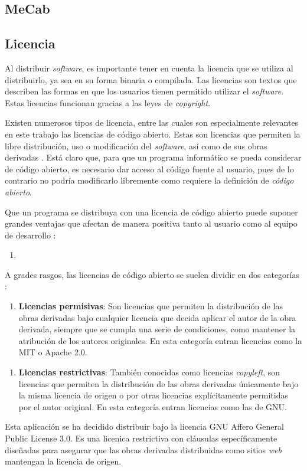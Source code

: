 \subsection{MeCab}

\subsection{Licencia}

Al distribuir \textit{software}, es importante tener en cuenta la licencia que se utiliza al distribuirlo, ya sea en su forma binaria o compilada. Las licencias son textos que describen las formas en que los usuarios tienen permitido utilizar el \textit{software}. Estas licencias funcionan gracias a las leyes de \textit{copyright}.

Existen numerosos tipos de licencia, entre las cuales son especialmente relevantes en este trabajo las licencias de código abierto. Estas son licencias que permiten la libre distribución, uso o modificación del \textit{software}, así como de sus obras derivadas \citationNeeded. Está claro que, para que un programa informático se pueda considerar de código abierto, es necesario dar acceso al código fuente al usuario, pues de lo contrario no podría modificarlo libremente como requiere la definición de \textit{código abierto}.

Que un programa se distribuya con una licencia de código abierto puede suponer grandes ventajas que afectan de manera positiva tanto al usuario como al equipo de desarrollo \autocite{almarzouq2005open, Heron2013}:

\begin{enumerate}
	\item 
\end{enumerate}

A grades rasgos, las licencias de código abierto se suelen dividir en dos categorías \citationNeeded:

\begin{enumerate}
	\item \textbf{Licencias permisivas}: Son licencias que permiten la distribución de las obras derivadas bajo cualquier licencia que decida aplicar el autor de la obra derivada, siempre que se cumpla una serie de condiciones, como mantener la atribución de los autores originales. En esta categoría entran licencias como la MIT o Apache 2.0.
\end{enumerate}

\begin{enumerate}
	\item \textbf{Licencias restrictivas}: También conocidas como licencias \textit{copyleft}, son licencias que permiten la distribución de las obras derivadas únicamente bajo la misma licencia de origen o por otras licencias explícitamente permitidas por el autor original. En esta categoría entran licencias como las de GNU.
\end{enumerate}

Esta aplicación se ha decidido distribuir bajo la licencia GNU Affero General Public License 3.0. Es una licenica restrictiva con cláusulas específicamente diseñadas para asegurar que las obras derivadas distribuidas como sitios \textit{web} mantengan la licencia de origen. \citationNeeded
